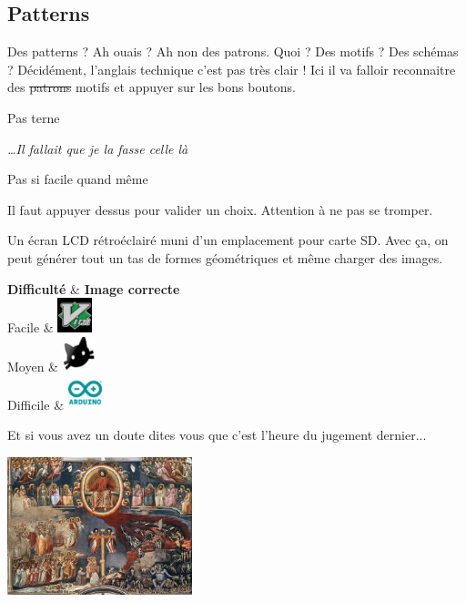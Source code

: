 \subsection{Patterns}
Des patterns ? Ah ouais ? Ah non des patrons. Quoi ? Des motifs ? Des schémas ?
Décidément, l'anglais technique c'est pas très clair ! Ici il va falloir
reconnaitre des \sout{patrons} motifs et appuyer sur les bons boutons.
\begin{modulebox}{Pas terne}
  \begin{hangingpar}
    \begin{flushright}
    \textit{\dots Il fallait que je la fasse celle là}
    \end{flushright}
  \end{hangingpar}
  \begin{moduleaction}[Difficulté]
    Pas si facile quand même
  \end{moduleaction}
  \hline%
  \begin{moduleaction}[boutons]
    Il faut appuyer dessus pour valider un choix. Attention à ne pas se tromper.
  \end{moduleaction}
  \begin{moduleaction}
    Un écran LCD rétroéclairé muni d'un emplacement pour carte SD. Avec ça, on
    peut générer tout un tas de formes géométriques et même charger des images.
  \end{moduleaction}
\end{modulebox}
\begin{dndtable}
	\textbf{Difficulté} & \textbf{Image correcte} \\
	Facile & \qquad\includegraphics[height=1cm]{img/vim.jpg} \\
	Moyen & \qquad\includegraphics[height=1cm]{img/cat.jpg} \\
	Difficile & \qquad\includegraphics[height=1cm]{img/logo.jpg} \\
\end{dndtable}

\noindent Et si vous avez un doute dites vous que c'est l'heure du jugement dernier...
\newline
\vspace{0.5cm}
\centerline{\includegraphics[height=4cm]{img/jugement-dernier.jpg}}
\newpage
